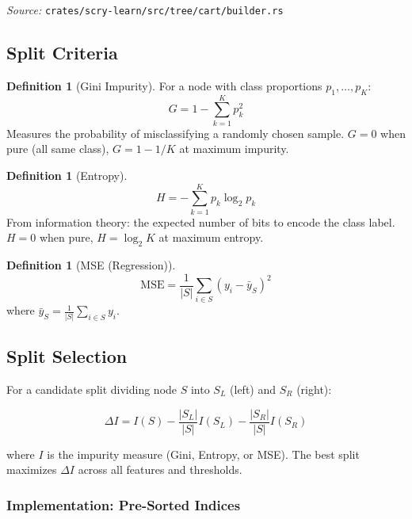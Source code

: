 \documentclass[11pt,a4paper]{article}
\theoremstyle{definition}
\newtheorem{definition}[theorem]{Definition}
\theoremstyle{remark}
\begin{document}
\noindent\textit{Source:} \texttt{crates/scry-learn/src/tree/cart/builder.rs}

\subsection{Split Criteria}

\begin{definition}[Gini Impurity]
For a node with class proportions $p_1, \ldots, p_K$:
\begin{equation}
G = 1 - \sum_{k=1}^K p_k^2
\end{equation}
Measures the probability of misclassifying a randomly chosen sample. $G = 0$ when pure (all same class), $G = 1 - 1/K$ at maximum impurity.
\end{definition}

\begin{definition}[Entropy]
\begin{equation}
H = -\sum_{k=1}^K p_k \log_2 p_k
\end{equation}
From information theory: the expected number of bits to encode the class label. $H = 0$ when pure, $H = \log_2 K$ at maximum entropy.
\end{definition}

\begin{definition}[MSE (Regression)]
\begin{equation}
\text{MSE} = \frac{1}{|S|}\sum_{i \in S}(y_i - \bar{y}_S)^2
\end{equation}
where $\bar{y}_S = \frac{1}{|S|}\sum_{i \in S} y_i$.
\end{definition}

\subsection{Split Selection}

For a candidate split dividing node $S$ into $S_L$ (left) and $S_R$ (right):

\begin{equation}
\Delta I = I(S) - \frac{|S_L|}{|S|}I(S_L) - \frac{|S_R|}{|S|}I(S_R)
\end{equation}

where $I$ is the impurity measure (Gini, Entropy, or MSE). The best split maximizes $\Delta I$ across all features and thresholds.

\subsubsection*{Implementation: Pre-Sorted Indices}
\end{document}

